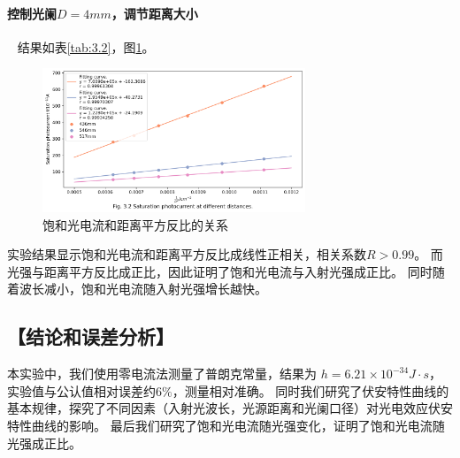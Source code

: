\documentclass[12pt,a4paper,UTF8]{ctexart}
\begin{document}
    \paragraph{控制光阑$D=4mm$，调节距离大小}~
    \newline
    \indent
    结果如表\ref{tab:3.2}，图\ref{fig:3.2}。
    \begin{table}[htbp]
        \centering
            \caption{\textbf{饱和光电流和距离平方反比的关系}}
            \label{tab:3.2}
    \end{table}

    \begin{figure}[htbp]
        \centering
        \includegraphics[width=0.7\textwidth]{attachments/fig.3.2.png}
        \caption{饱和光电流和距离平方反比的关系}
        \label{fig:3.2}
    \end{figure}
    实验结果显示饱和光电流和距离平方反比成线性正相关，相关系数$R>0.99$。
    而光强与距离平方反比成正比，因此证明了饱和光电流与入射光强成正比。
    同时随着波长减小，饱和光电流随入射光强增长越快。
\subsection*{【结论和误差分析】}
本实验中，我们使用零电流法测量了普朗克常量，结果为
$h = 6.21 \times 10^{-34} J \cdot s$，实验值与公认值相对误差约$6\%$，测量相对准确。
同时我们研究了伏安特性曲线的基本规律，探究了不同因素（入射光波长，光源距离和光阑口径）对光电效应伏安特性曲线的影响。
最后我们研究了饱和光电流随光强变化，证明了饱和光电流随光强成正比。
\end{document}
